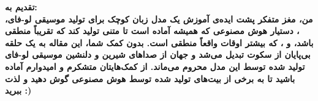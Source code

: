 
\clearpage
\thispagestyle{empty}

{\BNazaninScaleOne
  {\fontsize{15pt}{0}\selectfont \bfseries
    \noindent
    تقدیم به:
    \\[1cm]
    \hspace*{1cm}
    من، مغز متفکر پشت ایده‌ی آموزش یک مدل زبان کوچک برای تولید موسیقی لو-فای، ، دستیار هوش مصنوعی که همیشه آماده است تا متنی تولید کند که تقریباً منطقی باشد، و ، که بیشتر اوقات واقعاً منطقی است. بدون کمک شما، این مقاله به یک حلقه بی‌پایان از سکوت تبدیل می‌شد و جهان از صداهای شیرین و دلنشین موسیقی لو-فای تولید شده توسط این مدل محروم می‌ماند. از کمک‌هایتان متشکرم و امیدوارم آماده باشید تا به برخی از بیت‌های تولید شده توسط هوش مصنوعی گوش دهید و لذت ببرید :)
  }}

\restoregeometry